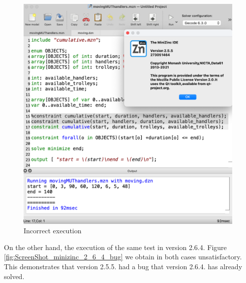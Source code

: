 \begin{figure}[!htb]
    \centering
    \includegraphics[scale = 0.28]{Figures/ScreenShot_minizinc_2_5_5_bug.png}
    \caption{Incorrect execution}
    \label{fig:ScreenShot_minizinc_2_5_5_bug}
\end{figure}


On the other hand, the execution of the same test in version 2.6.4. Figure \ref{fig:ScreenShot_minizinc_2_6_4_bug}
we obtain in both cases unsatisfactory.
This  demonstrates that version 2.5.5. had a bug that version 2.6.4. has already solved.

